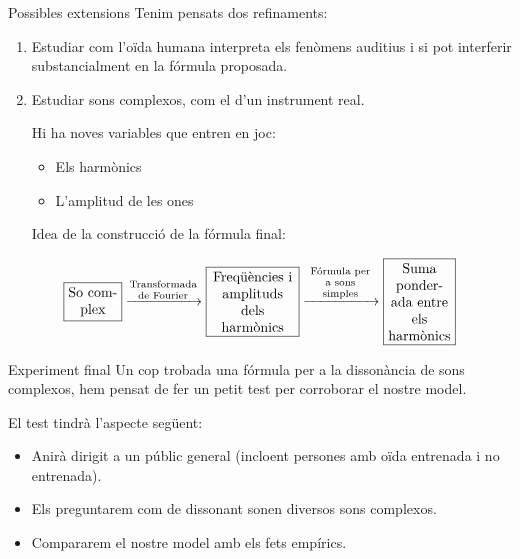 \documentclass[10pt,hyperref={colorlinks,linkcolor=black,citecolor=blue,urlcolor=blue!70},handout]{beamer}
\begin{document}
\begin{frame}{Possibles extensions}
  Tenim pensats dos refinaments:
  \begin{enumerate}
    \item Estudiar com l'oïda humana interpreta els fenòmens auditius i si pot interferir substancialment en la fórmula proposada.\pause
    \item Estudiar sons complexos, com el d'un instrument real.\par\pause
          Hi ha noves variables que entren en joc:
          \begin{itemize}
            \item Els harmònics\pause
            \item L'amplitud de les ones\pause
          \end{itemize}
          \vspace{0.5cm}
          Idea de la construcció de la fórmula final:
  \end{enumerate}
  $$\boxed{\parbox{3.5em}{\centering So complex}}\xrightarrow{\parbox{4.8em}{\centering\scriptsize Transformada de Fourier}}\boxed{\parbox{6em}{\centering Freqüències i amplituds dels harmònics}}\xrightarrow{\parbox{4.8em}{\centering\scriptsize Fórmula per a sons simples}}\boxed{\parbox{4.5em}{\centering Suma ponderada entre els harmònics}}$$
\end{frame}
\begin{frame}{Experiment final}
  Un cop trobada una fórmula per a la dissonància de sons complexos, hem pensat de fer un petit test per corroborar el nostre model.\par\pause El test tindrà l'aspecte següent:
  \begin{itemize}
    \item Anirà dirigit a un públic general (incloent persones amb oïda entrenada i no entrenada).\pause
    \item Els preguntarem com de dissonant sonen diversos sons complexos.\pause
    \item Compararem el nostre model amb els fets empírics.
  \end{itemize}
\end{frame}
\end{document}
